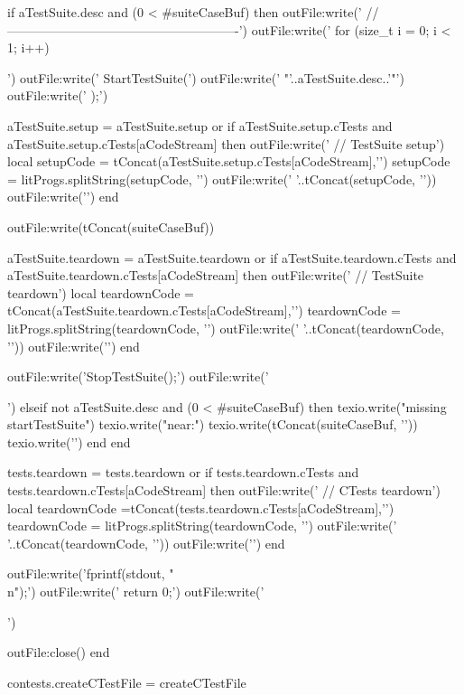 {    if aTestSuite.desc and (0 < #suiteCaseBuf) then
      outFile:write('  //-------------------------------------------------------\n')
      outFile:write('  for (size_t i = 0; i < 1; i++) {\n\n')
      outFile:write('    StartTestSuite(\n')
      outFile:write('      "'..aTestSuite.desc..'"\n')
      outFile:write('    );\n\n')

      aTestSuite.setup = aTestSuite.setup or { }
      if aTestSuite.setup.cTests and
        aTestSuite.setup.cTests[aCodeStream] then
        outFile:write('    // TestSuite setup\n')
        local setupCode = tConcat(aTestSuite.setup.cTests[aCodeStream],'\n  ')
        setupCode = litProgs.splitString(setupCode, '\n')
        outFile:write('    '..tConcat(setupCode, '\n    '))
        outFile:write('\n\n')
      end

      outFile:write(tConcat(suiteCaseBuf))

      aTestSuite.teardown = aTestSuite.teardown or { }
      if aTestSuite.teardown.cTests and
        aTestSuite.teardown.cTests[aCodeStream] then
        outFile:write('    // TestSuite teardown\n')
        local teardownCode = tConcat(aTestSuite.teardown.cTests[aCodeStream],'\n  ')
        teardownCode = litProgs.splitString(teardownCode, '\n')
        outFile:write('    '..tConcat(teardownCode, '\n    '))
        outFile:write('\n\n')
      end

      outFile:write('\n    StopTestSuite();\n\n')
      outFile:write('  }\n\n')
    elseif not aTestSuite.desc and (0 < #suiteCaseBuf) then
      texio.write("\nERROR missing \\startTestSuite\n")
      texio.write("near:\n")
      texio.write(tConcat(suiteCaseBuf, '\n'))
      texio.write('\n')
    end
  end

  tests.teardown = tests.teardown or { }
  if tests.teardown.cTests and
    tests.teardown.cTests[aCodeStream] then
    outFile:write('  // CTests teardown\n')
    local teardownCode =tConcat(tests.teardown.cTests[aCodeStream],'\n  ')
    teardownCode = litProgs.splitString(teardownCode, '\n')
    outFile:write('  '..tConcat(teardownCode, '\n  '))
    outFile:write('\n\n')
  end

  outFile:write('\n  fprintf(stdout, "\\n");\n\n')
  outFile:write('  return 0;\n')
  outFile:write('}\n')

  outFile:close()
end

contests.createCTestFile = createCTestFile

